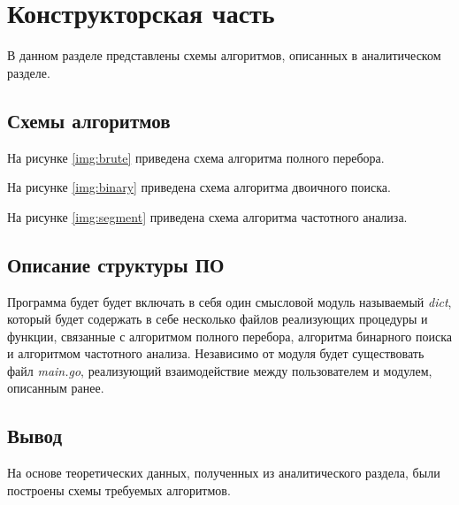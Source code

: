 \chapter{Конструкторская часть}

В данном разделе представлены схемы алгоритмов, описанных в аналитическом разделе.

\section{Схемы алгоритмов}

На рисунке \ref{img:brute} приведена схема алгоритма полного перебора.


\clearpage

На рисунке \ref{img:binary} приведена схема алгоритма двоичного поиска.


\clearpage

На рисунке \ref{img:segment} приведена схема алгоритма частотного анализа.


\clearpage


\section{Описание структуры ПО}
Программа будет будет включать в себя один смысловой модуль называемый \textit{dict}, который будет содержать в себе несколько файлов реализующих процедуры и функции, связанные с алгоритмом полного перебора, алгоритма бинарного поиска и алгоритмом частотного анализа. Независимо от модуля будет существовать файл \textit{main.go}, реализующий взаимодействие между пользователем и модулем, описанным ранее.

\section{Вывод}

На основе теоретических данных, полученных из аналитического раздела, были построены схемы требуемых алгоритмов.
